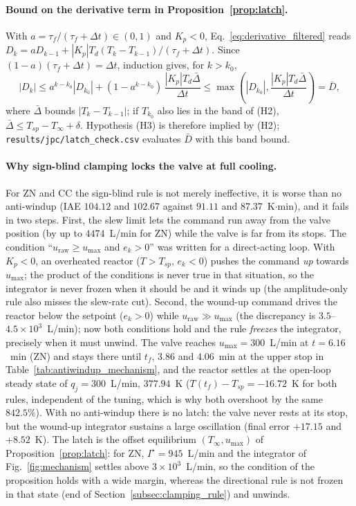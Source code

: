 \documentclass[11pt]{article}
\begin{document}
\paragraph{Bound on the derivative term in Proposition~\ref{prop:latch}.} With $a = \tau_f/(\tau_f + \Delta t) \in (0, 1)$ and $K_p < 0$, Eq.~\eqref{eq:derivative_filtered} reads $D_k = a D_{k-1} + |K_p|T_d(T_k - T_{k-1})/(\tau_f + \Delta t)$. Since $(1-a)(\tau_f + \Delta t) = \Delta t$, induction gives, for $k > k_0$,
\begin{equation}
    |D_k| \le a^{k-k_0}|D_{k_0}| + (1 - a^{k-k_0})\,\frac{|K_p| T_d \bar\Delta}{\Delta t} \le \max\!\left(|D_{k_0}|, \frac{|K_p| T_d \bar\Delta}{\Delta t}\right) = \bar D,
    \label{eq:dbar}
\end{equation}
where $\bar\Delta$ bounds $|T_k - T_{k-1}|$; if $T_{k_0}$ also lies in the band of (H2), $\bar\Delta \le T_{sp} - T_\infty + \delta$. Hypothesis (H3) is therefore implied by (H2); \texttt{results/jpc/latch\_check.csv} evaluates $\bar D$ with this band bound.



\paragraph{Why sign-blind clamping locks the valve at full cooling.} For ZN and CC the sign-blind rule is not merely ineffective, it is worse than no anti-windup (IAE $104.12$ and $102.67$ against $91.11$ and $87.37$~K$\cdot$min), and it fails in two steps. First, the slew limit lets the command run away from the valve position (by up to $4474$~L/min for ZN) while the valve is far from its stops. The condition ``$u_{\text{raw}} \ge u_{\max}$ and $e_k > 0$'' was written for a direct-acting loop. With $K_p < 0$, an overheated reactor ($T > T_{sp}$, $e_k < 0$) pushes the command \emph{up} towards $u_{\max}$; the product of the conditions is never true in that situation, so the integrator is never frozen when it should be and it winds up (the amplitude-only rule also misses the slew-rate cut). Second, the wound-up command drives the reactor below the setpoint ($e_k > 0$) while $u_{\text{raw}} \gg u_{\max}$ (the discrepancy is $3.5$--$4.5\times 10^{3}$~L/min); now both conditions hold and the rule \emph{freezes} the integrator, precisely when it must unwind. The valve reaches $u_{\max} = 300$~L/min at $t = 6.16$~min (ZN) and stays there until $t_f$, $3.86$ and $4.06$~min at the upper stop in Table~\ref{tab:antiwindup_mechanism}, and the reactor settles at the open-loop steady state of $q_j = 300$~L/min, $377.94$~K ($T(t_f) - T_{sp} = -16.72$~K for both rules, independent of the tuning, which is why both overshoot by the same $842.5\%$). With no anti-windup there is no latch: the valve never rests at its stop, but the wound-up integrator sustains a large oscillation (final error $+17.15$ and $+8.52$~K). The latch is the offset equilibrium $(T_\infty, u_{\max})$ of Proposition~\ref{prop:latch}: for ZN, $I^\star = 945$~L/min and the integrator of Fig.~\ref{fig:mechanism} settles above $3\times10^{3}$~L/min, so the condition of the proposition holds with a wide margin, whereas the directional rule is not frozen in that state (end of Section~\ref{subsec:clamping_rule}) and unwinds.
\end{document}
